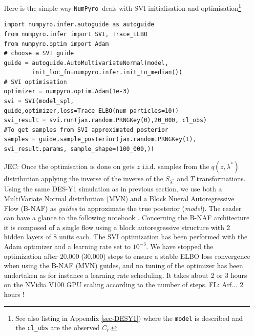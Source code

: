 \documentclass[twocolumn,twocolappendix,nofootinbib,iop]{openjournal}
\newcommand{\nblink}[1]{\href{https://github.com/DifferentiableUniverseInitiative/jax-cosmo-paper/blob/master/notebooks/#1.ipynb}{\faFileCodeO}}
\newcommand{\FrL}[1]{{\color{cyan}FL: #1}}
\newcommand{\JEC}[1]{{\color{magenta}JEC: #1}}
\newcommand{\numpyro}{\texttt{NumPyro}}
\begin{document}
Here is the simple way \numpyro\ deals with SVI initialisation and optimisation\footnote{See also listing in Appendix \ref{sec-DESY1}) where the \texttt{model} is described and the \texttt{cl\_obs} are the observed $C_\ell$.}
\begin{lstlisting}[language=iPython]
import numpyro.infer.autoguide as autoguide
from numpyro.infer import SVI, Trace_ELBO
from numpyro.optim import Adam
# choose a SVI guide 
guide = autoguide.AutoMultivariateNormal(model,
        init_loc_fn=numpyro.infer.init_to_median())
# SVI optimisation 
optimizer = numpyro.optim.Adam(1e-3)
svi = SVI(model_spl, guide,optimizer,loss=Trace_ELBO(num_particles=10))
svi_result = svi.run(jax.random.PRNGKey(0),20_000, cl_obs)
#To get samples from SVI approximated posterior 
samples = guide.sample_posterior(jax.random.PRNGKey(1), svi_result.params, sample_shape=(100_000,))
\end{lstlisting}
%
\JEC{Once the optimisation is done on gets $z$ i.i.d. samples from the $q(z,\lambda^\ast)$ distribution  applying the inverse of the inverse of the $S_{\lambda^\ast}$ and $T$ transformations. Using the same DES-Y1 simulation as in previous section, we use both a MultiVariate Normal distribution (MVN) and a Block Nueral Autoregressive Flow (B-NAF) \citep{pmlr-v115-de-cao20a} as \textit{guides} to approximate the true posterior (\textit{model}). The reader can have a glance to the following notebook \nblink{DES_Y1_SVI_and_NeutraReparam}. Concerning the B-NAF architecture it is composed of  a single flow using a block autoregressive structure with 2 hidden layers of 8 units each. The SVI optimization has been performed with the Adam optimizer \citep{KingmaB14} and a learning rate set to $10^{-3}$. We have stopped the optimization after 20,000 (30,000) steps to ensure a stable ELBO loss convergence when using the B-NAF (MVN) guides, and no tuning of the optimizer has been undertaken as for instance a learning rate scheduling. It takes about 2 or 3 hours on the NVidia V100 GPU scaling according to the number of steps}.  \FrL{Arf... 2 hours !} 
\end{document}
